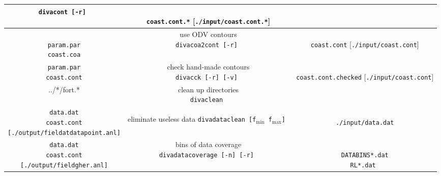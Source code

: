 \begin{table}
\begin{center}
{{\begin{tabular}{c|c|c}
{{\tt divacont [-r]  } 
\\
{  { }  }
}
& 
\shortstack{
{  { }  } \\
{\tt coast.cont.*}  { } [{\tt ./input/coast.cont.*}] \\
{  { }  }
}
 \\ \hline
 \shortstack{
 {  { }  } \\
{\tt param.par} \\
{\tt coast.coa} 
}
 & 
\shortstack{
{\sf use ODV contours} \\
{\tt divacoa2cont [-r]  } 
\\
{  { }  }
}
& 
\shortstack{
{  { }  } \\
{\tt coast.cont}  { } [{\tt ./input/coast.cont}] \\
{  { }  }
}
 \\ \hline
 \shortstack{
{\tt param.par} \\
{\tt coast.cont} 
}
 & 
\shortstack{
{\sf check hand-made contours} \\
{\tt divacck [-r] [-v]  } 
\\
{  { }  }
}
& 
\shortstack{
{  { }  } \\
{\tt coast.cont.checked}  { } [{\tt ./input/coast.cont}] \\
{  { }  }
}
 \\ \hline
 ../*/fort.*
 & 
 \shortstack{
 {\sf clean up directories} \\
{\tt divaclean  } 
}
& 
 { }
 \\ \hline
 \shortstack{
{\tt data.dat} \\
{\tt coast.cont} \\
{\tt [./output/fieldatdatapoint.anl]} 
}
 & 
\shortstack{
{\sf eliminate useless data} \\
{\tt divadataclean  [f$_{\min}$  f$_{\max}$]  } 
\\
{  { }  }
}
& 
\shortstack{
{  { }  } \\
{\tt ./input/data.dat} \\
{  { }  }
}
 \\ \hline
 \shortstack{
{\tt data.dat} \\
{\tt coast.cont} \\
{\tt [./output/fieldgher.anl]} 
}
 & 
\shortstack{
{\sf bins of data coverage} \\
{\tt divadatacoverage  [-n] [-r]  } 
\\
{  { }  }
}
& 
\shortstack{
{  { }  } \\
{\tt DATABINS*.dat} \\
{  {\tt RL*.dat }  }
}
 \\ \hline

\end{tabular}}}
\end{center}
\end{table}
